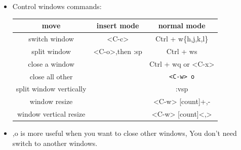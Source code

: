 \documentclass[a4paper,11pt,twoside]{book}
\begin{document}
\begin{itemize}
		\item Control windows commands:

\begin{center}
   \begin{tabular}{c|c|c}
   \hline
		move & insert mode & normal mode \\
		
\hline 
		switch window & <C-c> &  Ctrl + w\{h,j,k,l\}\\
				
		\hline 
		split window & <C-o>,then :sp  &  Ctrl + ws\\
		
		\hline 
		close a window & & Ctrl + wq or <C-x>\\
		
		\hline 
		close all other & & \texttt{<C-w> o} \\

		\hline
		split window vertically	&   & :vsp \\ 
        

		\hline
		window resize	& &  <C-w> [count]+,- \\ 

		\hline
		window vertical resize	& &  <C-w> [count]<,> \\ 
		
\hline 
			\end{tabular}
	\end{center}

\item <C-w>,o is more useful when you want to close other windows, You don't need switch to another windows.
\end{itemize}
	
\end{document}
